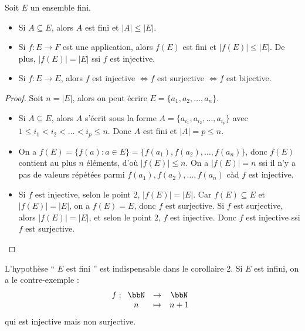 \begin{cor}
    Soit $E$ un ensemble fini.
    \begin{itemize}
        \item Si $A \subseteq E$, alors $A$ est fini et $|A| \leqslant |E|$.
        \item Si $f: E \to F$ est une application, alors $f(E)$ est fini et $|f(E)| \leqslant |E|$.
              De plus, $|f(E)|=|E|$ ssi $f$ est injective.
        \item Si $f: E \to E$, alors $f$ est injective $\iff f$ est surjective $\iff f$ est bijective.
    \end{itemize}
\end{cor}

\begin{proof}
    Soit $n=|E|$, alors on peut écrire $E=\{a_1, a_2, \dots, a_n\}$.
    \begin{itemize}
        \item Si $A \subseteq E$, alors $A$ s'écrit sous la forme
              $A=\{a_{i_1}, a_{i_2}, \dots, a_{i_p}\}$ avec $1 \le i_1 < i_2 < \dots < i_p \le n$.
              Donc $A$ est fini et $|A|=p \leqslant n$.
        \item On a $f(E)= \{f(a): a \in E\}=\{f(a_1), f(a_2), \dots, f(a_n)\}$,
              donc $f(E)$ contient au plus $n$ éléments, d'où $|f(E)| \leqslant n$.
              On a $|f(E)|= n$ ssi il n'y a pas de valeurs répétées parmi
              $f(a_1), f(a_2), \dots, f(a_n)$ càd $f$ est injective.
        \item Si $f$ est injective, selon le point 2, $|f(E)|=|E|$.
              Car $f(E) \subseteq E$ et $|f(E)|=|E|$, on a $f(E)=E$, donc $f$ est surjective.
              Si $f$ est surjective, alors $|f(E)|=|E|$, et selon le point 2, $f$ est injective.
              Donc $f$ est injective ssi $f$ est surjective.
    \end{itemize}
\end{proof}

\begin{rqq}
    L'hypothèse `` $E$ est fini '' est indispensable dans le corollaire 2.
    Si $E$ est infini, on a le contre-exemple :
    \[
        f:
        \begin{array}[t]{ccc}
            \bbN          & \to & \bbN       \\
            n          & \tp & n+1
        \end{array}
    \]
    qui est injective mais non surjective.
\end{rqq}

